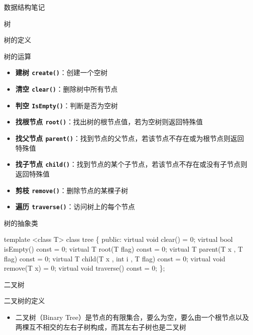 \documentclass[
  ignorenonframetext,
]{beamer}
\newenvironment{Shaded}{}{}
\newcommand{\NormalTok}[1]{#1}
\providecommand{\tightlist}{%
  \setlength{\itemsep}{0pt}\setlength{\parskip}{0pt}}
\begin{document}
\begin{frame}[fragile]{数据结构笔记}
\begin{block}{树}
\begin{block}{树的定义}
\begin{block}{树的运算}
\protect{}\label{ux6811ux7684ux8fd0ux7b97}
\begin{itemize}
\tightlist
\item
  \textbf{建树 \texttt{create()}}：创建一个空树
\item
  \textbf{清空 \texttt{clear()}}：删除树中所有节点
\item
  \textbf{判空 \texttt{IsEmpty()}}：判断是否为空树
\item
  \textbf{找根节点
  \texttt{root()}}：找出树的根节点值，若为空树则返回特殊值
\item
  \textbf{找父节点
  \texttt{parent()}}：找到节点的父节点，若该节点不存在或为根节点则返回特殊值
\item
  \textbf{找子节点
  \texttt{child()}}：找到节点的某个子节点，若该节点不存在或没有子节点则返回特殊值
\item
  \textbf{剪枝 \texttt{remove()}}：删除节点的某棵子树
\item
  \textbf{遍历 \texttt{traverse()}}：访问树上的每个节点
\end{itemize}
\end{block}

\begin{block}{树的抽象类}
\protect{}\label{ux6811ux7684ux62bdux8c61ux7c7b}
\begin{Shaded}
\begin{Highlighting}[]
\NormalTok{template \textless{}class T\textgreater{}}
\NormalTok{class tree}
\NormalTok{\{}
\NormalTok{  public:}
\NormalTok{    virtual void clear() = 0;}
\NormalTok{    virtual bool isEmpty() const = 0;}
\NormalTok{    virtual T root(T flag) const = 0;}
\NormalTok{    virtual T parent(T x , T flag) const = 0;}
\NormalTok{    virtual T child(T x , int i , T flag) const = 0;}
\NormalTok{    virtual void remove(T x) = 0;}
\NormalTok{    virtual void traverse() const = 0;}
\NormalTok{\};}
\end{Highlighting}
\end{Shaded}
\end{block}
\end{block}

\begin{block}{二叉树}
\protect{}\label{ux4e8cux53c9ux6811}
\begin{block}{二叉树的定义}
\protect{}\label{ux4e8cux53c9ux6811ux7684ux5b9aux4e49}
\begin{itemize}
\tightlist
\item
  二叉树（Binary
  Tree）是节点的有限集合，要么为空，要么由一个根节点以及两棵互不相交的左右子树构成，而其左右子树也是二叉树
\end{itemize}


\end{block}
\end{block}
\end{block}
\end{frame}
\end{document}
